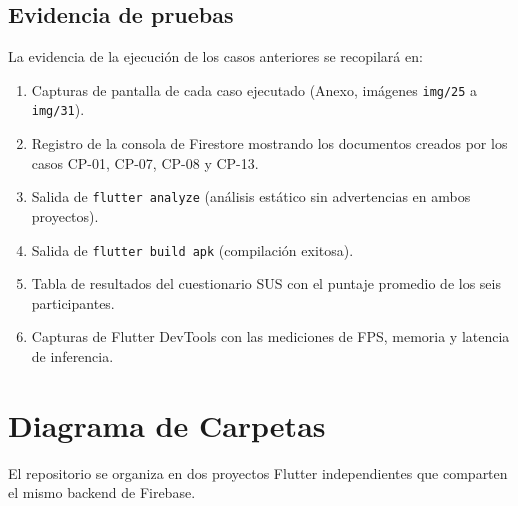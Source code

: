 \documentclass[12pt,a4paper]{article}
\begin{document}
\subsection{Evidencia de pruebas}

La evidencia de la ejecución de los casos anteriores se recopilará en:

\begin{enumerate}
  \item Capturas de pantalla de cada caso ejecutado (Anexo, imágenes
        \texttt{img/25} a \texttt{img/31}).
  \item Registro de la consola de Firestore mostrando los documentos creados por
        los casos CP-01, CP-07, CP-08 y CP-13.
  \item Salida de \texttt{flutter analyze} (análisis estático sin advertencias en
        ambos proyectos).
  \item Salida de \texttt{flutter build apk} (compilación exitosa).
  \item Tabla de resultados del cuestionario SUS con el puntaje promedio de los
        seis participantes.
  \item Capturas de Flutter DevTools con las mediciones de FPS, memoria y
        latencia de inferencia.
\end{enumerate}

\section{Diagrama de Carpetas}

El repositorio se organiza en dos proyectos Flutter independientes que comparten
el mismo backend de Firebase.
\end{document}
